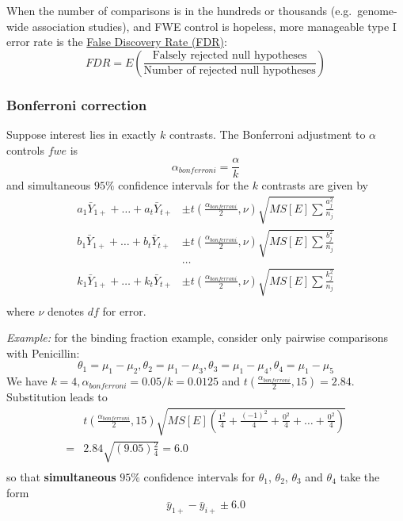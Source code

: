 When the number of comparisons is in the hundreds or thousands (e.g.~genome-wide association studies), and FWE control is hopeless, more manageable type I error rate is the \underline{False Discovery Rate (FDR)}:
$$
FDR = \textit{E}(\frac{\mbox{Falsely rejected null hypotheses}}{\mbox{Number of rejected null hypotheses}})
$$

\subsubsection*{Bonferroni correction}
Suppose interest lies in exactly $k$ contrasts.
The Bonferroni adjustment to $\alpha$ controls $fwe$ is
$$
\alpha_{bonferroni} = \frac{\alpha}{k}
$$
and simultaneous $95\%$ confidence intervals for the $k$ contrasts are given by
$$
\begin{aligned}
	a_1 \bar{Y}_{1+} + \dots + a_t \bar{Y}_{t+} &\pm t(\frac{\alpha_{bonferroni}}{2}, \nu) \sqrt{MS[E]\sum \frac{a_j^2}{n_j}}\\
	b_1 \bar{Y}_{1+} + \dots + b_t \bar{Y}_{t+} &\pm t(\frac{\alpha_{bonferroni}}{2}, \nu) \sqrt{MS[E]\sum \frac{b_j^2}{n_j}}\\	
	&\dots\\
	k_1 \bar{Y}_{1+} + \dots + k_t \bar{Y}_{t+} &\pm t(\frac{\alpha_{bonferroni}}{2}, \nu) \sqrt{MS[E]\sum \frac{k_j^2}{n_j}}\\
\end{aligned}
$$
where $\nu$ denotes $df$ for error.

{\it Example: } for the binding fraction example, consider only pairwise comparisons with Penicillin:
$$
\theta_1 = \mu_1 - \mu_2, \theta_2 = \mu_1 - \mu_3, \theta_3 = \mu_1  - \mu_4, \theta_4 = \mu_1 - \mu_5
$$
We have $k=4, \alpha_{bonferroni} = 0.05/k = 0.0125$ and $t(\frac{\alpha_{bonferroni}}{2}, 15) = 2.84$.
Substitution leads to
$$
\begin{aligned}
&t(\frac{\alpha_{bonferroni}}{2}, 15)\sqrt{MS[E]\left( \frac{1^2}{4} + \frac{(-1)^2}{4} + \frac{0^2}{4} + \dots + \frac{0^2}{4}\right)}\\
=& 2.84 \sqrt{(9.05)\frac{2}{4}} = 6.0\\
\end{aligned}
$$
so that {\bf simultaneous} $95\%$ confidence intervals for $\theta_1$, $\theta_2$, $\theta_3$ and $\theta_4$ take the form
$$
\bar{y}_{1+} - \bar{y}_{i+} \pm 6.0
$$


